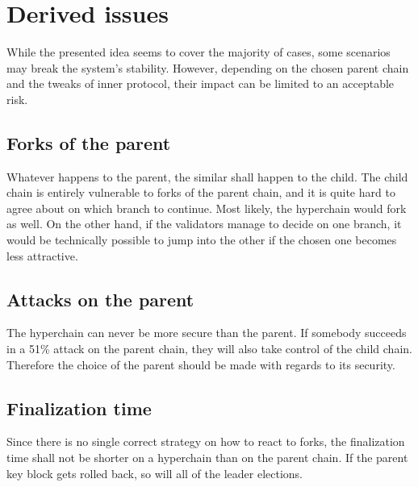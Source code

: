 \section{Derived issues}

While the presented idea seems to cover the majority of cases, some
scenarios may break the system's stability. However, depending on the
chosen parent chain and the tweaks of inner protocol, their impact
can be limited to an acceptable risk.

\subsection{Forks of the parent}

Whatever happens to the parent, the similar shall happen to the child. The child
chain is entirely vulnerable to forks of the parent chain, and it is quite hard
to agree about on which branch to continue. Most likely, the
hyperchain would fork as well. On the other hand, if the validators manage to
decide on one branch, it would be technically possible to jump into the other
if the chosen one becomes less attractive.

\subsection{Attacks on the parent}

The hyperchain can never be more secure than the parent.
If somebody succeeds in a 51\% attack on the parent chain,
they will also take control of the child chain.
Therefore the choice of the parent should be made with regards to its security.

\subsection{Finalization time}

Since there is no single correct strategy on how to react to forks, the
finalization time shall not be shorter on a hyperchain than on the parent chain.
If the parent key block gets rolled back, so will all of the leader elections.
